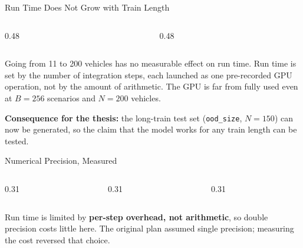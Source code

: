 \begin{frame}{Run Time Does Not Grow with Train Length}
  \vspace{0.3em}
  \begin{columns}[T,onlytextwidth]
    \begin{column}{0.48\textwidth}
      \throughputConsist
    \end{column}
    \begin{column}{0.48\textwidth}
      \throughputBatch
    \end{column}
  \end{columns}

  \vspace{0.6em}
  \begin{minipage}{0.94\textwidth}\small
    \alert{Going from 11 to 200 vehicles has no measurable effect on run time.}
    Run time is set by the number of integration steps, each launched as one
    pre-recorded GPU operation, not by the amount of arithmetic. The GPU is far
    from fully used even at $B = 256$ scenarios and $N = 200$ vehicles.

    \vspace{0.4em}
    \textbf{Consequence for the thesis:} the long-train test set
    (\texttt{ood\_size}, $N = 150$) can now be generated, so the claim that the
    model works for any train length can be tested.
  \end{minipage}
\end{frame}

\begin{frame}{Numerical Precision, Measured}
  \vspace{1.0em}
  \begin{columns}[c,onlytextwidth]
    \begin{column}{0.31\textwidth}\centering
    \end{column}
    \begin{column}{0.31\textwidth}\centering
    \end{column}
    \begin{column}{0.31\textwidth}\centering
    \end{column}
  \end{columns}

  \vspace{1.6em}
  \begin{minipage}{0.92\textwidth}\small
    Run time is limited by \textbf{per-step overhead, not arithmetic}, so double
    precision costs little here. The original plan assumed single precision;
    measuring the cost reversed that choice.
  \end{minipage}
\end{frame}

